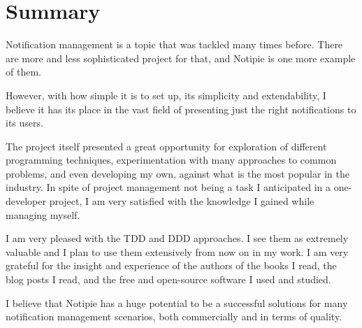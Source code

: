 \section{Summary}\label{sec:summary}

Notification management is a topic
that was tackled many times before.
There are more and less sophisticated
project for that,
and Notipie is one more example of them.

However,
with how simple it is to set up,
its simplicity and extendability,
I believe it has its place
in the vast field of
presenting just the right notifications
to its users.

The project itself presented a great opportunity
for exploration of different programming techniques,
experimentation with many approaches to common problems,
and even developing my own,
against what is the most popular in the industry.
In spite of project management
not being a task I anticipated
in a one-developer project,
I am very satisfied with the knowledge
I gained while managing myself.

I am very pleased with the TDD and DDD approaches.
I see them as extremely valuable
and I plan to use them extensively
from now on in my work.
I am very grateful for the insight
and experience of the authors of the books I read,
the blog posts I read,
and the free and open-source software
I used and studied.

I believe that Notipie has a huge potential
to be a successful solutions for many
notification management scenarios,
both commercially
and in terms of quality.
